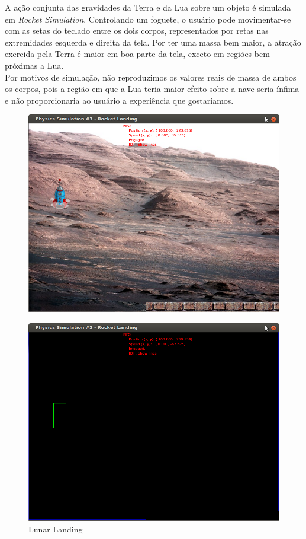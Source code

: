 A ação conjunta das gravidades da Terra e da Lua sobre um objeto é simulada em \textit{Rocket Simulation}. Controlando um foguete, o usuário pode movimentar-se com as setas do teclado entre os dois corpos, representados por retas nas extremidades esquerda e direita da tela. Por ter uma massa bem maior, a atração exercida pela Terra é maior em boa parte da tela, exceto em regiões bem próximas a Lua. \\

Por motivos de simulação, não reproduzimos os valores reais de massa de ambos os corpos, pois a região em que a Lua teria maior efeito sobre a nave seria ínfima e não proporcionaria ao usuário a experiência que gostaríamos. \\

\begin{figure}[H]
\centering
	\includegraphics[scale=0.4]{images/lunarLanding.png}
\end{figure}
\begin{figure}[H]
\centering
	\includegraphics[scale=0.4]{images/lunarLandingE.png}
	\caption{Lunar Landing}
\end{figure}

